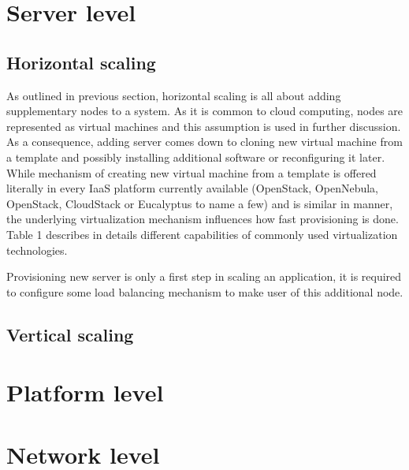 \section{Server level}

\subsection{Horizontal scaling}
As outlined in previous section, horizontal scaling is all about adding supplementary nodes to a system. As it is common to cloud computing, nodes are represented as virtual machines and this assumption is used in further discussion. As a consequence, adding server comes down to cloning new virtual machine from a template and possibly installing additional software or reconfiguring it later. While mechanism of creating new virtual machine from a template is offered literally in every IaaS platform currently available (OpenStack, OpenNebula, OpenStack, CloudStack or Eucalyptus to name a few) and is similar in manner, the underlying virtualization mechanism influences how fast provisioning is done. Table 1 describes in details different capabilities of commonly used virtualization technologies.

Provisioning new server is only a first step in scaling an application, it is required to configure some load balancing mechanism to make user of this additional node. 

\subsection{Vertical scaling}

\section{Platform level}

\section{Network level}

